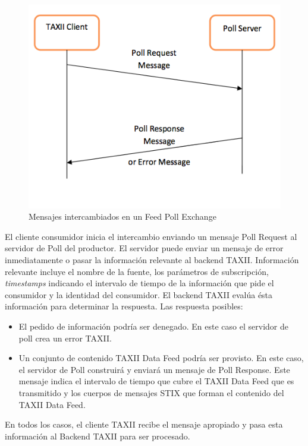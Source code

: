 \begin{figure}[ht!]
  \centering
    \includegraphics[width=150mm]{./images/FeedPollExchange.png}
    \caption{Mensajes intercambiados en un Feed Poll Exchange \protect\cite{b1}}
\end{figure}

El cliente consumidor inicia el intercambio enviando un mensaje Poll Request al 
servidor de Poll del productor. El servidor puede enviar un mensaje de error 
inmediatamente o pasar la información relevante al backend TAXII. Información 
relevante incluye el nombre de la fuente, los parámetros de subscripción, 
\textit{timestamps} indicando el intervalo de tiempo de la información que pide el 
consumidor y la identidad del consumidor. El backend TAXII evalúa ésta
información para determinar la respuesta. Las respuesta posibles:
\begin{itemize}
  \item El pedido de información podría ser denegado. En este caso el servidor 
  de poll crea un error TAXII. 
  \item Un conjunto de contenido TAXII Data Feed podría ser provisto. En este 
  caso, el servidor de Poll construirá y enviará un mensaje de Poll Response. 
  Este mensaje indica el intervalo de tiempo que cubre el TAXII Data Feed que es 
  transmitido y los cuerpos de mensajes STIX que forman el contenido del TAXII 
  Data Feed.
\end{itemize}
En todos los casos, el cliente TAXII recibe el mensaje apropiado y pasa esta 
información al Backend TAXII para ser procesado.

